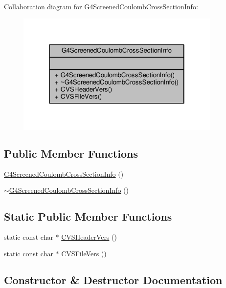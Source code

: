 Collaboration diagram for G4\+Screened\+Coulomb\+Cross\+Section\+Info\+:
\nopagebreak
\begin{figure}[H]
\begin{center}
\leavevmode
\includegraphics[width=286pt]{classG4ScreenedCoulombCrossSectionInfo__coll__graph}
\end{center}
\end{figure}
\subsection*{Public Member Functions}
\begin{DoxyCompactItemize}
\item 
\hyperlink{classG4ScreenedCoulombCrossSectionInfo_a229d69bad25086922802331c8c7b7f89}{G4\+Screened\+Coulomb\+Cross\+Section\+Info} ()
\item 
\hyperlink{classG4ScreenedCoulombCrossSectionInfo_ac89a2e7748d9c66937e96aa96ea43518}{$\sim$\+G4\+Screened\+Coulomb\+Cross\+Section\+Info} ()
\end{DoxyCompactItemize}
\subsection*{Static Public Member Functions}
\begin{DoxyCompactItemize}
\item 
static const char $\ast$ \hyperlink{classG4ScreenedCoulombCrossSectionInfo_ae27f3e0f725a0541e271618772c287a8}{C\+V\+S\+Header\+Vers} ()
\item 
static const char $\ast$ \hyperlink{classG4ScreenedCoulombCrossSectionInfo_aa97230886b5279b5fe0413e19ab944a9}{C\+V\+S\+File\+Vers} ()
\end{DoxyCompactItemize}


\subsection{Constructor \& Destructor Documentation}
